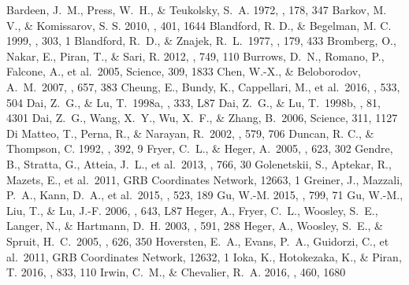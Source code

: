 \documentclass[twocolumn]{aastex6}
\begin{document}
\begin{thebibliography}{}
 Bardeen, J.~M., Press, W.~H., \& Teukolsky, S.~A. 1972, \apj, 178, 347
 Barkov, M. V., \& Komissarov, S. S. 2010, \mnras, 401, 1644
 Blandford, R. D., \& Begelman, M. C. 1999, \mnras, 303, 1
 Blandford, R.~D., \& Znajek, R.~L.\ 1977, \mnras, 179, 433
 Bromberg, O., Nakar, E., Piran, T., \& Sari, R. 2012, \apj, 749, 110
 Burrows, D.~N., Romano, P., Falcone, A., et al.\ 2005, Science, 309, 1833
 Chen, W.-X., \& Beloborodov, A.~M.\ 2007, \apj, 657, 383
 Cheung, E., Bundy, K., Cappellari, M., et al.\ 2016, \nat, 533, 504
 Dai, Z.~G., \& Lu, T.\ 1998a, \aap, 333, L87
 Dai, Z.~G., \& Lu, T.\ 1998b, \prl, 81, 4301
 Dai, Z.~G., Wang, X.~Y., Wu, X.~F., \& Zhang, B.\ 2006, Science, 311, 1127
 Di Matteo, T., Perna, R., \& Narayan, R.\ 2002, \apj, 579, 706
 Duncan, R. C., \& Thompson, C. 1992, \apjl, 392, 9
 Fryer, C.~L., \& Heger, A.\ 2005, \apj, 623, 302
 Gendre, B., Stratta, G., Atteia, J.~L., et al.\ 2013, \apj, 766, 30
 Golenetskii, S., Aptekar, R., Mazets, E., et al.\ 2011, GRB Coordinates Network, 12663, 1
 Greiner, J., Mazzali, P.~A., Kann, D.~A., et al.\ 2015, \nat, 523, 189
 Gu, W.-M. 2015, \apj, 799, 71
 Gu, W.-M., Liu, T., \& Lu, J.-F. 2006, \apjl, 643, L87
 Heger, A., Fryer, C.~L., Woosley, S.~E., Langer, N., \& Hartmann, D.~H. 2003, \apj, 591, 288
 Heger, A., Woosley, S.~E., \& Spruit, H.~C.\ 2005, \apj, 626, 350
 Hoversten, E.~A., Evans, P.~A., Guidorzi, C., et al.\ 2011, GRB Coordinates Network, 12632, 1
 Ioka, K., Hotokezaka, K., \& Piran, T. 2016, \apj, 833, 110
 Irwin, C.~M., \& Chevalier, R.~A. 2016, \mnras, 460, 1680

\end{thebibliography}
\end{document}
